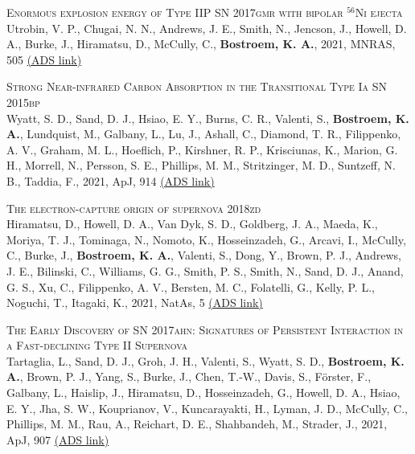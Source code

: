 \begin{revnumerate}[67]
    \item{\textsc{Enormous explosion energy of Type IIP SN 2017gmr with bipolar ${}^{56}$Ni ejecta}\\ 
    Utrobin, V. P., Chugai, N. N., Andrews, J. E., Smith, N., Jencson, J., Howell, D. A., Burke, J., Hiramatsu, D., McCully, C., \textbf{Bostroem, K. A.}, 2021, MNRAS, 505 
    \color{blue}\href{https://ui.adsabs.harvard.edu/abs/2021MNRAS.505..116U}{(ADS link)}\color{black}}\\
    
    \item{\textsc{Strong Near-infrared Carbon Absorption in the Transitional Type Ia SN 2015bp}\\ 
    Wyatt, S. D., Sand, D. J., Hsiao, E. Y., Burns, C. R., Valenti, S., \textbf{Bostroem, K. A.}, Lundquist, M., Galbany, L., Lu, J., Ashall, C., Diamond, T. R., Filippenko, A. V., Graham, M. L., Hoeflich, P., Kirshner, R. P., Krisciunas, K., Marion, G. H., Morrell, N., Persson, S. E., Phillips, M. M., Stritzinger, M. D., Suntzeff, N. B., Taddia, F., 2021, ApJ, 914 
    \color{blue}\href{https://ui.adsabs.harvard.edu/abs/2021ApJ...914...57W}{(ADS link)}\color{black}}\\
    
    \item{\textsc{The electron-capture origin of supernova 2018zd}\\ 
    Hiramatsu, D., Howell, D. A., Van Dyk, S. D., Goldberg, J. A., Maeda, K., Moriya, T. J., Tominaga, N., Nomoto, K., Hosseinzadeh, G., Arcavi, I., McCully, C., Burke, J., \textbf{Bostroem, K. A.}, Valenti, S., Dong, Y., Brown, P. J., Andrews, J. E., Bilinski, C., Williams, G. G., Smith, P. S., Smith, N., Sand, D. J., Anand, G. S., Xu, C., Filippenko, A. V., Bersten, M. C., Folatelli, G., Kelly, P. L., Noguchi, T., Itagaki, K., 2021, NatAs, 5 
    \color{blue}\href{https://ui.adsabs.harvard.edu/abs/2021NatAs...5..903H}{(ADS link)}\color{black}}\\
    
    \item{\textsc{The Early Discovery of SN 2017ahn: Signatures of Persistent Interaction in a Fast-declining Type II Supernova}\\ 
    Tartaglia, L., Sand, D. J., Groh, J. H., Valenti, S., Wyatt, S. D., \textbf{Bostroem, K. A.}, Brown, P. J., Yang, S., Burke, J., Chen, T.-W., Davis, S., F\"{o}rster, F., Galbany, L., Haislip, J., Hiramatsu, D., Hosseinzadeh, G., Howell, D. A., Hsiao, E. Y., Jha, S. W., Kouprianov, V., Kuncarayakti, H., Lyman, J. D., McCully, C., Phillips, M. M., Rau, A., Reichart, D. E., Shahbandeh, M., Strader, J., 2021, ApJ, 907 
    \color{blue}\href{https://ui.adsabs.harvard.edu/abs/2021ApJ...907...52T}{(ADS link)}\color{black}}\\
    

\end{revnumerate}
